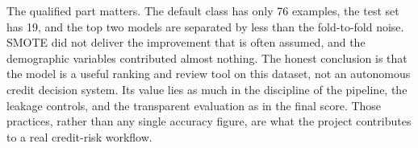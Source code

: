 The qualified part matters. The default class has only 76 examples, the test set has 19, and the top two models are separated by less than the fold-to-fold noise. SMOTE did not deliver the improvement that is often assumed, and the demographic variables contributed almost nothing. The honest conclusion is that the model is a useful ranking and review tool on this dataset, not an autonomous credit decision system. Its value lies as much in the discipline of the pipeline, the leakage controls, and the transparent evaluation as in the final score. Those practices, rather than any single accuracy figure, are what the project contributes to a real credit-risk workflow.
